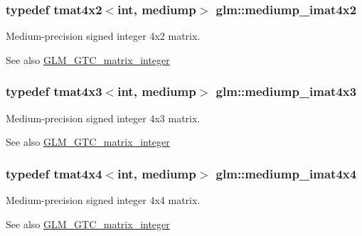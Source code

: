 \subsubsection[{mediump\+\_\+imat4x2}]{\setlength{\rightskip}{0pt plus 5cm}typedef tmat4x2$<$int, mediump$>$ {\bf glm\+::mediump\+\_\+imat4x2}}\label{group__gtc__matrix__integer_gabfe107153637dfd7a0c272ff1ba892ed}
Medium-\/precision signed integer 4x2 matrix. \begin{DoxySeeAlso}{See also}
\hyperlink{group__gtc__matrix__integer}{G\+L\+M\+\_\+\+G\+T\+C\+\_\+matrix\+\_\+integer} 
\end{DoxySeeAlso}
\hypertarget{group__gtc__matrix__integer_ga0da8b13e141337d016a6541ea2c0362c}{}
\subsubsection[{mediump\+\_\+imat4x3}]{\setlength{\rightskip}{0pt plus 5cm}typedef tmat4x3$<$int, mediump$>$ {\bf glm\+::mediump\+\_\+imat4x3}}\label{group__gtc__matrix__integer_ga0da8b13e141337d016a6541ea2c0362c}
Medium-\/precision signed integer 4x3 matrix. \begin{DoxySeeAlso}{See also}
\hyperlink{group__gtc__matrix__integer}{G\+L\+M\+\_\+\+G\+T\+C\+\_\+matrix\+\_\+integer} 
\end{DoxySeeAlso}
\hypertarget{group__gtc__matrix__integer_gae226af929e72730be59a58d89a4be028}{}
\subsubsection[{mediump\+\_\+imat4x4}]{\setlength{\rightskip}{0pt plus 5cm}typedef tmat4x4$<$int, mediump$>$ {\bf glm\+::mediump\+\_\+imat4x4}}\label{group__gtc__matrix__integer_gae226af929e72730be59a58d89a4be028}
Medium-\/precision signed integer 4x4 matrix. \begin{DoxySeeAlso}{See also}
\hyperlink{group__gtc__matrix__integer}{G\+L\+M\+\_\+\+G\+T\+C\+\_\+matrix\+\_\+integer} 
\end{DoxySeeAlso}
\hypertarget{group__gtc__matrix__integer_ga85bc35173415dba31bb964c2940feeec}{}
